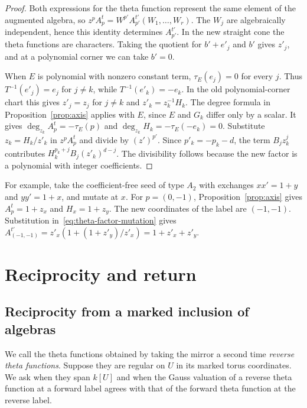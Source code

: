 \documentclass[11pt,reqno]{amsart}
\numberwithin{equation}{section}
\theoremstyle{definition}
\theoremstyle{remark}
\begin{document}
\begin{proof}
Both expressions for the theta function represent the same element of
the augmented algebra, so \(z^p A_p^t=W^{p'} A^{t'}_{p'}(W_1,\ldots,W_r)\).
The \(W_j\) are algebraically independent, hence this identity
determines \(A^{t'}_{p'}\). In the new straight cone the theta functions
are characters. Taking the quotient for \(b'+e'_j\) and \(b'\) gives
\(z'_j\), and at a polynomial corner we can take \(b'=0\).

When \(E\) is polynomial with nonzero constant term,
\(\tau_E(e_j)=0\) for every \(j\). Thus \(T^{-1}(e'_j)=e_j\) for
\(j\ne k\), while \(T^{-1}(e'_k)=-e_k\). In the old polynomial-corner
chart this gives \(z'_j=z_j\) for \(j\ne k\) and
\(z'_k=z_k^{-1}H_k\). The degree formula in Proposition~\ref{prop:axis}
applies with \(E\), since \(E\) and \(G_k\) differ only by a scalar.
It gives \(\deg_{z_k}A^t_p=-\tau_E(p)\) and
\(\deg_{z_k}H_k=-\tau_E(-e_k)=0\). Substitute \(z_k=H_k/z'_k\)
in \(z^p A_p^t\) and divide by \((z')^{p'}\). Since \(p'_k=-p_k-d\),
the term \(B_j z_k^j\) contributes \(H_k^{p_k+j}B_j(z'_k)^{d-j}\).
The divisibility follows because the new factor is a polynomial with
integer coefficients.
\end{proof}

For example, take the coefficient-free seed of type \(A_2\) with
exchanges \(xx'=1+y\) and \(yy'=1+x\), and mutate at \(x\).
For \(p=(0,-1)\), Proposition~\ref{prop:axis} gives
\(A_p^t=1+z_x\) and \(H_x=1+z_y\). The new coordinates of the label
are \((-1,-1)\). Substitution in~\eqref{eq:theta-factor-mutation} gives
\(A^{t'}_{(-1,-1)}=z'_x(1+(1+z'_y)/z'_x)=1+z'_x+z'_y\).

\section{Reciprocity and return}\label{sec:reciprocity}

\subsection{Reciprocity from a marked inclusion of algebras}

We call the theta functions obtained by taking the mirror a second time
\emph{reverse theta functions}. Suppose they are regular on \(U\) in
its marked torus coordinates. We ask when they span \(k[U]\) and when
the Gauss valuation of a reverse theta function at a forward label
agrees with that of the forward theta function at the reverse label.
\end{document}
